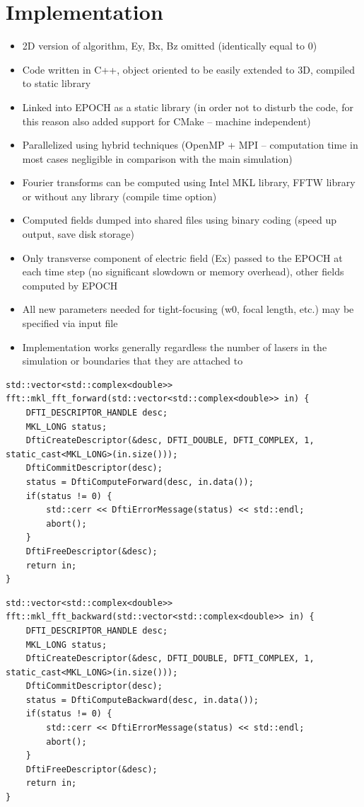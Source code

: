 \section{Implementation}

\begin{itemize}
	\item 2D version of algorithm, Ey, Bx, Bz omitted (identically equal to 0) 
	\item Code written in C++, object oriented to be easily extended to 3D, compiled to static library
	\item Linked into EPOCH as a static library (in order not to disturb the code, for this reason also added support for CMake – machine independent)
	\item Parallelized using hybrid techniques (OpenMP + MPI – computation time in most cases negligible in comparison with the main simulation)
	\item Fourier transforms can be computed using Intel MKL library, FFTW library or without any library (compile time option)
	\item Computed fields dumped into shared files using binary coding (speed up output, save disk storage)
	\item Only transverse component of electric field (Ex) passed to the EPOCH at each time step (no significant slowdown or memory overhead), other fields computed by EPOCH
	\item All new parameters needed for tight-focusing (w0, focal length, etc.) may be specified via input file
	\item Implementation works generally regardless the number of lasers in the simulation or boundaries that they are attached to
\end{itemize}

\begin{lstlisting}[style=CXX, caption=Function performing forward fast Fourier transform using MKL library]
std::vector<std::complex<double>> fft::mkl_fft_forward(std::vector<std::complex<double>> in) {
	DFTI_DESCRIPTOR_HANDLE desc;
	MKL_LONG status;
	DftiCreateDescriptor(&desc, DFTI_DOUBLE, DFTI_COMPLEX, 1, static_cast<MKL_LONG>(in.size()));
	DftiCommitDescriptor(desc);
	status = DftiComputeForward(desc, in.data());
	if(status != 0) {
		std::cerr << DftiErrorMessage(status) << std::endl;
		abort();
	}
	DftiFreeDescriptor(&desc);
	return in;
}
\end{lstlisting}

\begin{lstlisting}[style=CXX, caption=Function performing backward fast Fourier transform using MKL library]
std::vector<std::complex<double>> fft::mkl_fft_backward(std::vector<std::complex<double>> in) {
	DFTI_DESCRIPTOR_HANDLE desc;
	MKL_LONG status;
	DftiCreateDescriptor(&desc, DFTI_DOUBLE, DFTI_COMPLEX, 1, static_cast<MKL_LONG>(in.size()));
	DftiCommitDescriptor(desc);
	status = DftiComputeBackward(desc, in.data());
	if(status != 0) {
		std::cerr << DftiErrorMessage(status) << std::endl;
		abort();
	}
	DftiFreeDescriptor(&desc);
	return in;
}
\end{lstlisting}

